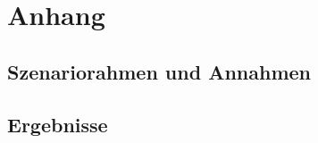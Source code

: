 \appendix

\section{Anhang}

\subsection{Szenariorahmen und Annahmen}









\subsection{Ergebnisse}





\clearpage

